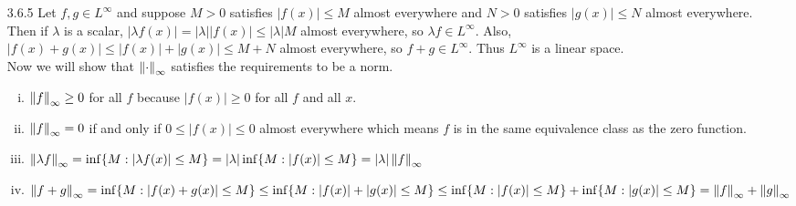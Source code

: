 \documentclass[../../Solutions.tex]{subfiles}
\begin{document}
\begin{itemize}
	\item [3.6.5] Let $f,g \in L^\infty$ and suppose $M > 0$ satisfies $|f(x)| \leq M$ almost everywhere and $N > 0$ satisfies $|g(x)| \leq N$ almost everywhere.
		Then if $\lambda$ is a scalar, $|\lambda f(x)| = |\lambda||f(x)| \leq |\lambda|M$ almost everywhere, so $\lambda f \in L^\infty$.
		Also, $|f(x)+g(x)| \leq |f(x)|+|g(x)| \leq M+N$ almost everywhere, so $f+g \in L^\infty$.
		Thus $L^\infty$ is a linear space. \\
		Now we will show that $\left\lVert\cdot\right\rVert_\infty$ satisfies the requirements to be a norm.
		\begin{enumerate}[(i)]
			\item $\left\lVert f\right\rVert_\infty \geq 0$ for all $f$ because $|f(x)| \geq 0$ for all $f$ and all $x$.
			\item $\left\lVert f\right\rVert_\infty = 0$ if and only if $0 \leq |f(x)| \leq 0$ almost everywhere which means $f$ is in the same equivalence class as the zero function.
			\item $\left\lVert\lambda f\right\rVert_\infty = \inf\{M : |\lambda f(x)| \leq M\} = |\lambda|\inf\{M:|f(x)|\leq M\} = |\lambda|\left\lVert f\right\rVert_\infty$
			\item $\left\lVert f+g\right\rVert_\infty = \inf\{M:|f(x)+g(x)|\leq M\} \leq \inf\{M:|f(x)|+|g(x)|\leq M\} \leq \inf\{M:|f(x)|\leq M\} + \inf\{M:|g(x)|\leq M\} = \left\lVert f\right\rVert_\infty + \left\lVert g\right\rVert_\infty$
		\end{enumerate}
	

\end{itemize}
\end{document}

